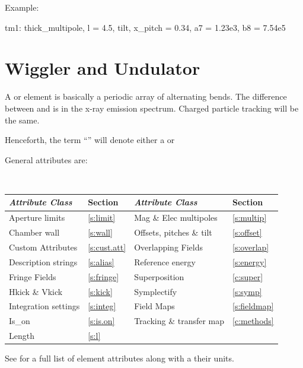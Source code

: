 {Example:
\begin{example}
  tm1: thick_multipole, l = 4.5, tilt, x_pitch = 0.34, a7 = 1.23e3, b8 = 7.54e5
\end{example}

\newpage

\section{Wiggler and Undulator} 
\label{s:wiggler}

A  or  element is basically a periodic array of alternating bends.
The difference between  and  is in the x-ray emission spectrum.
Charged particle tracking will be the same. 

Henceforth, the term ``'' will denote either a  or 

General  attributes are:
\begin{center}
\tt
\begin{tabular}{llll} \toprule
  {\sl Attribute Class}      & Section           & {\sl Attribute Class}      & Section            \\ \midrule
  Aperture limits            & \ref{s:limit}     & Mag \& Elec multipoles     & \ref{s:multip}     \\
  Chamber wall               & \ref{s:wall}      & Offsets, pitches \& tilt   & \ref{s:offset}     \\
  Custom Attributes          & \ref{s:cust.att}  & Overlapping Fields         & \ref{s:overlap}    \\
  Description strings        & \ref{s:alias}     & Reference energy           & \ref{s:energy}     \\ 
  Fringe Fields              & \ref{s:fringe}    & Superposition              & \ref{c:super}      \\
  Hkick \& Vkick             & \ref{s:kick}      & Symplectify                & \ref{s:symp}       \\
  Integration settings       & \ref{s:integ}     & Field Maps                 & \ref{s:fieldmap}   \\
  Is_on                      & \ref{s:is.on}     & Tracking \& transfer map   & \ref{c:methods}    \\ 
  Length                     & \ref{s:l}         &                            &                    \\ 
  \bottomrule
\end{tabular}
\end{center}
\toffset
See  for a full list of element attributes along with a their units.

}

